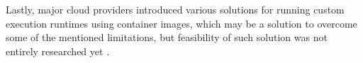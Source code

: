Lastly, major cloud providers introduced various solutions for running custom execution runtimes using container images, which may be a solution to overcome some of the mentioned limitations, but feasibility of such solution was not entirely researched yet \cite{AWSLambdaContainerImageSupport}.




